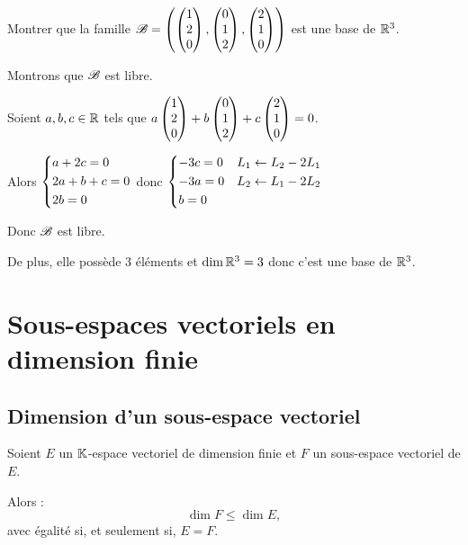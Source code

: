\begin{exo}
Montrer que la famille \(\mathscr{B}=\left(\begin{pmatrix}1\\2\\0\end{pmatrix},\begin{pmatrix}0\\1\\2\end{pmatrix},\begin{pmatrix}2\\1\\0\end{pmatrix}\right)\) est une base de \(\mathbb{R}^3\).
\end{exo}

\begin{corr}
Montrons que \(\mathscr{B}\) est libre.

Soient \(a,b,c\in\mathbb{R}\) tels que \(a\begin{pmatrix}1\\2\\0\end{pmatrix}+b\begin{pmatrix}0\\1\\2\end{pmatrix}+c\begin{pmatrix}2\\1\\0\end{pmatrix}=0\).

Alors \(\begin{dcases}
a+2c=0 \\
2a+b+c=0 \\
2b=0
\end{dcases}\) donc \(\begin{dcases}
-3c=0 &L_1\gets L_2-2L_1 \\
-3a=0 &L_2\gets L_1-2L_2 \\
b=0
\end{dcases}\)

Donc \(\mathscr{B}\) est libre.

De plus, elle possède \(3\) éléments et \(\dim\mathbb{R}^3=3\) donc c'est une base de \(\mathbb{R}^3\).
\end{corr}

\section{Sous-espaces vectoriels en dimension finie}

\subsection{Dimension d'un sous-espace vectoriel}

\begin{theo}
Soient \(E\) un \(\mathbb{K}\)-espace vectoriel de dimension finie et \(F\) un sous-espace vectoriel de \(E\).

Alors : \[\dim F\leq\dim E,\] avec égalité si, et seulement si, \(E=F\).
\end{theo}

